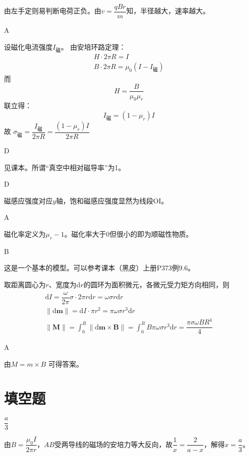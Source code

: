 \documentclass[b5paper,opensource,sourcefont,parskip]{qyxf-book}
\newcommand{\di}[1]{\mathrm{d}#1}
\begin{document}
\solve
由左手定则易判断电荷正负。由$v=\dfrac{qBr}{m}$知，半径越大，速率越大。

A

\solve
设磁化电流强度$I_\text{磁}$。
由安培环路定理：
\begin{gather*}
H\cdot 2\pi R=I\\
B\cdot 2\pi R=\mu_0(I-I_\text{磁})
\end{gather*}
而
\[
H=\dfrac{B}{\mu_0\mu_r}
\]
联立得：
\[
I_\text{磁}=(1-\mu_r)I
\]
故
$\sigma_\text{磁}=\dfrac{I_\text{磁}}{2\pi R}=\dfrac{(1-\mu_r)I}{2\pi R}$
\footnotemark[1]

D

\solve
见课本。所谓“真空中相对磁导率”为1。

D

\solve
磁感应强度对应$y$轴，饱和磁感应强度显然为线段OI。

A

\solve
磁化率定义为$\mu_r-1$。磁化率大于$0$但很小的即为顺磁性物质。

B

\solve
这是一个基本的模型。可以参考课本（黑皮）上册\rm{P}373例9.6。

取距离圆心为$r$、宽度为$\di{r}$的圆环为面积微元，各微元受力矩方向相同，则
\begin{gather*}
\di{I}=\dfrac{\omega}{2\pi}\sigma\cdot 2\pi r\di{r}=\omega\sigma r\di{r}\\
\|\di{\textbf{m}}\|=\di{I}\cdot \pi r^2=\pi\omega\sigma r^3\di{r}\\
\|\textbf{M}\|=\int_{0}^{R}\|\di{\textbf{m}}\times \textbf{B}\|=\int_{0}^{R}B\pi\omega\sigma r^3\di{r}=\dfrac{\pi\sigma\omega BR^4}{4}
\end{gather*}

A

\solve
由$M=m\times B$
\footnotemark[2]
可得答案。

\section{填空题}

$\dfrac{a}{3}$

\solve
由$B=\dfrac{\mu_0I}{2\pi r}$，$AB$受两导线的磁场的安培力等大反向，故$\dfrac{1}{x}=\dfrac{2}{a-x}$，解得$x=\dfrac{a}{3}$。
\end{document}
